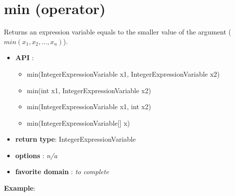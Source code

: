 
\section{min (operator)}\label{min:minoperator}\hypertarget{min:minoperator}{}
Returns an expression variable equals to the smaller value of the argument (\(min(x_1, x_2, ..., x_n)\)).

\begin{itemize}
	\item \textbf{API} :
	\begin{itemize}
		\item min(IntegerExpressionVariable x1, IntegerExpressionVariable x2)
		\item min(int x1, IntegerExpressionVariable x2)
		\item min(IntegerExpressionVariable x1, int x2)
		\item min(IntegerExpressionVariable[] x)
	\end{itemize}
	\item \textbf{return type}: IntegerExpressionVariable
	\item \textbf{options} : \emph{n/a}
	\item \textbf{favorite domain} : \emph{to complete}
\end{itemize}

\textbf{Example}:


